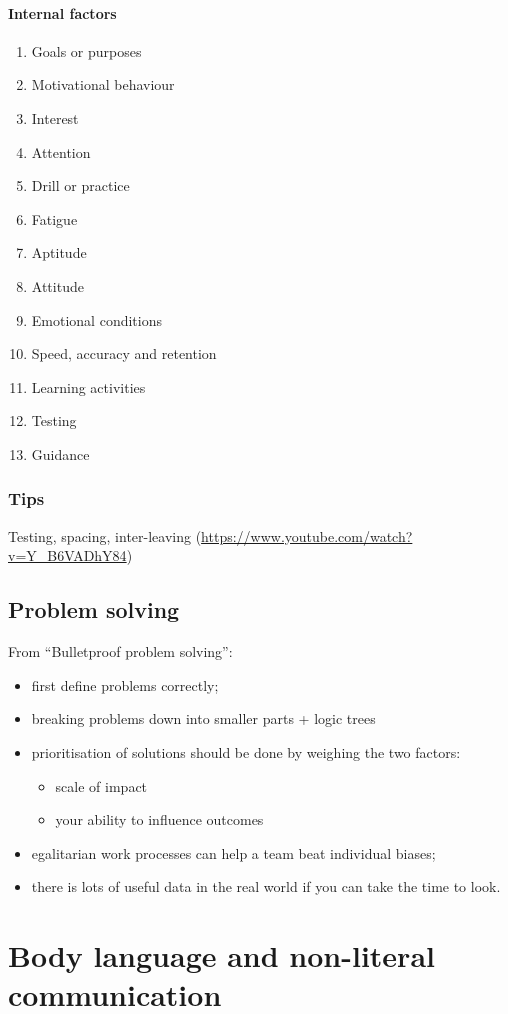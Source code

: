 \documentclass{report}
\begin{document}
\subsection{Internal factors}
\begin{enumerate}
\item Goals or purposes
\item Motivational behaviour
\item Interest
\item Attention
\item Drill or practice
\item Fatigue
\item Aptitude
\item Attitude
\item Emotional conditions
\item Speed, accuracy and retention
\item Learning activities
\item Testing
\item Guidance
\end{enumerate}
\section{Tips}
Testing, spacing, inter-leaving (\url{https://www.youtube.com/watch?v=Y_B6VADhY84})

\chapter{Problem solving}
From ``Bulletproof problem solving'':
\begin{itemize}
\item first define problems correctly;
\item breaking problems down into smaller parts + logic trees
\item prioritisation of solutions should be done by weighing the two factors:
\begin{itemize}
\item scale of impact
\item your ability to influence outcomes
\end{itemize}
\item egalitarian work processes can help a team beat individual biases;
\item there is lots of useful data in the real world if you can take the time to look.
\end{itemize}

\part{Body language and non-literal communication}
\setcounter{chapter}{0} %
\end{document}
